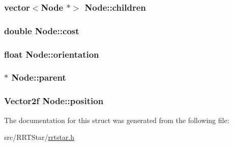 \subsubsection[{\texorpdfstring{children}{children}}]{\setlength{\rightskip}{0pt plus 5cm}vector$<${\bf Node} $\ast$$>$ Node\+::children}\hypertarget{structNode_a4403c570a373595bc3f82a8ca0bd2e61}{}\label{structNode_a4403c570a373595bc3f82a8ca0bd2e61}
\subsubsection[{\texorpdfstring{cost}{cost}}]{\setlength{\rightskip}{0pt plus 5cm}double Node\+::cost}\hypertarget{structNode_a6e7b74adca863064ca0d1684873f33e0}{}\label{structNode_a6e7b74adca863064ca0d1684873f33e0}
\subsubsection[{\texorpdfstring{orientation}{orientation}}]{\setlength{\rightskip}{0pt plus 5cm}float Node\+::orientation}\hypertarget{structNode_a7515a1624b4a54ed344792f3458c167d}{}\label{structNode_a7515a1624b4a54ed344792f3458c167d}
\subsubsection[{\texorpdfstring{parent}{parent}}]{$\ast$ Node\+::parent}\hypertarget{structNode_ad8184598cdea70e4bbdfd76f2b0f9e85}{}\label{structNode_ad8184598cdea70e4bbdfd76f2b0f9e85}
\subsubsection[{\texorpdfstring{position}{position}}]{\setlength{\rightskip}{0pt plus 5cm}Vector2f Node\+::position}\hypertarget{structNode_a4894d1352134bef767e5c1aba7aa3207}{}\label{structNode_a4894d1352134bef767e5c1aba7aa3207}


The documentation for this struct was generated from the following file\+:\begin{DoxyCompactItemize}
\item 
src/\+R\+R\+T\+Star/\hyperlink{rrtstar_8h}{rrtstar.\+h}\end{DoxyCompactItemize}
